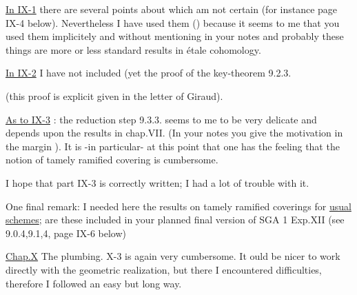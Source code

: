 \uline{In IX-1} there are several points about which  am not certain (for instance page IX-4 below). Nevertheless I have used them (\handwritten{!}) because it seems to me that you used them implicitely and without mentioning in your notes and probably these things are more or less standard results in étale cohomology.

\uline{In IX-2} I have not included (yet the proof of the key-theorem 9.2.3.

(this proof is explicit given in the letter of Giraud).

\uline{As to IX-3} : the reduction step 9.3.3. seems to me to be very delicate and depends upon the results in chap.VII. (In your notes you give the motivation in the margin \handwritten{!}). It is -in particular- at this point that one has the feeling that the notion of tamely ramified covering is cumbersome.

I hope that part IX-3 is correctly written; I had a lot of trouble with it.

One final remark: I needed here the results on tamely ramified coverings for \uline{usual schemes}; are these included in your planned final version of SGA 1 Exp.XII (see 9.0.4,9.1,4, page IX-6 below)

\uline{Chap.X} The plumbing. X-3 is again very cumbersome. It ould be nicer to work directly with the geometric realization, but there I encountered difficulties, therefore I followed an easy but long way.

